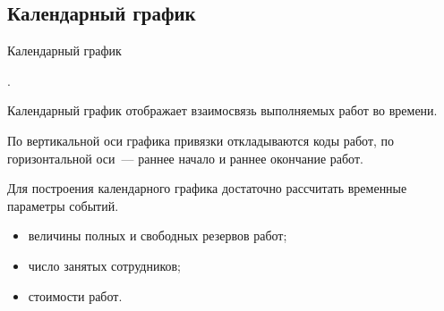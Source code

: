 \documentclass[unicode,11pt,notheorems]{beamer}
\begin{document}
\subsection{Календарный график}

\begin{frame}{Календарный график}

.
\begin{block}{}
Календарный график отображает взаимосвязь выполняемых работ во времени. 

По вертикальной оси графика привязки откладываются коды работ, по горизонтальной оси~--- раннее начало и раннее окончание работ.
\end{block}


Для построения календарного графика достаточно рассчитать временные параметры событий.
 
\begin{itemize}
\item 	
	величины полных и свободных резервов работ;
\item 	
	число занятых сотрудников;
\item 	
	стоимости работ.	
\end{itemize}

\end{frame}
\end{document}
